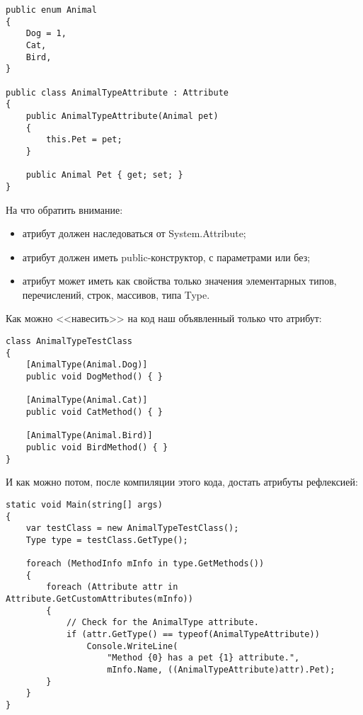 \documentclass{../../text-style}
\begin{document}
\begin{verbatim}
public enum Animal
{
    Dog = 1,
    Cat,
    Bird,
}

public class AnimalTypeAttribute : Attribute
{
    public AnimalTypeAttribute(Animal pet)
    {
        this.Pet = pet;
    }

    public Animal Pet { get; set; }
}
\end{verbatim}

На что обратить внимание:

\begin{itemize}
    \item атрибут должен наследоваться от System.Attribute;
    \item атрибут должен иметь public-конструктор, с параметрами или без;
    \item атрибут может иметь как свойства только значения элементарных типов, перечислений, строк, массивов, типа Type.
\end{itemize}

Как можно <<навесить>> на код наш объявленный только что атрибут:

\begin{verbatim}
class AnimalTypeTestClass
{
    [AnimalType(Animal.Dog)]
    public void DogMethod() { }

    [AnimalType(Animal.Cat)]
    public void CatMethod() { }

    [AnimalType(Animal.Bird)]
    public void BirdMethod() { }
}
\end{verbatim}

И как можно потом, после компиляции этого кода, достать атрибуты рефлексией:

\begin{verbatim}
static void Main(string[] args)
{
    var testClass = new AnimalTypeTestClass();
    Type type = testClass.GetType();

    foreach (MethodInfo mInfo in type.GetMethods())
    {
        foreach (Attribute attr in Attribute.GetCustomAttributes(mInfo))
        {
            // Check for the AnimalType attribute.
            if (attr.GetType() == typeof(AnimalTypeAttribute))
                Console.WriteLine(
                    "Method {0} has a pet {1} attribute.",
                    mInfo.Name, ((AnimalTypeAttribute)attr).Pet);
        }
    }
}
\end{verbatim}
\end{document}
